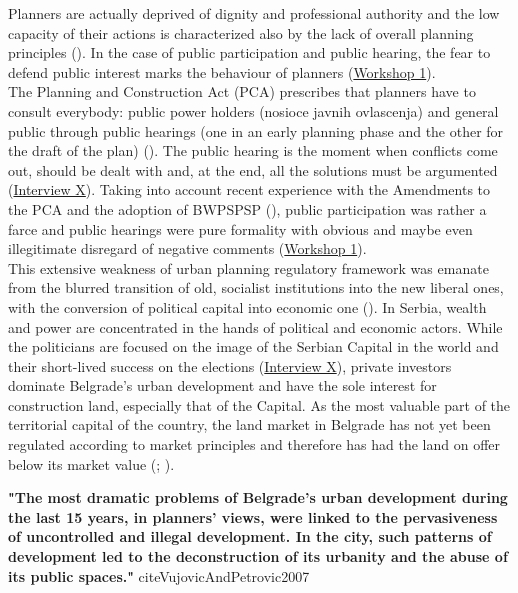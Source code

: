 \documentclass[11pt]{report}
\begin{document}
Planners are  actually deprived of dignity and professional authority and the low capacity of their actions is characterized also by the lack of overall planning principles (\href{ref}{\citealt{petrovic_cities_2009}}).
In the case of public participation and public hearing, the fear to defend public interest marks the behaviour of planners (\href{Expert Workshop}{Workshop 1}).
\\

The Planning and Construction Act (PCA) prescribes that planners have to consult everybody: public power holders (nosioce javnih ovlascenja) and general public through public hearings (one in an early planning phase and the other for the draft of the plan) (\cite{PCA}).
The public hearing is the moment when conflicts come out, should be dealt with and, at the end, all the solutions must be argumented (\href{InterviewX}{Interview X}).
Taking into account recent experience with the Amendments to the PCA and the adoption of BWPSPSP (\cite{ref media all different}), public participation was rather a farce and public hearings were pure formality with obvious and maybe even illegitimate disregard of negative comments (\href{Expert Workshop}{Workshop 1}).
\\ 

This extensive weakness of urban planning regulatory framework was emanate from the blurred transition of old, socialist institutions into the new liberal ones, with the conversion of political capital into economic one (\href{ref}{\citealt{vujovic_belgrades_2007}}).
In Serbia, wealth and power are concentrated in the hands of political and economic actors. While the politicians are focused on the image of the Serbian Capital in the world and their short-lived success on the elections (\href{InterviewX}{Interview X}),
private investors dominate Belgrade's urban development and have the sole interest for construction land, especially that of the Capital. As the most valuable part of the territorial capital of the country, the land market in Belgrade has not yet been regulated according to market principles and therefore has had the land on offer below its market value (\cite{SKGO2013}; \cite{Zekovic all ref}).
    
\textbf{"The most dramatic problems of Belgrade’s urban development during the last 15 years, in planners’ views, were linked to the pervasiveness of uncontrolled and illegal development. In the city, such patterns of development led to the deconstruction of its urbanity and the abuse of its public spaces."} cite{VujovicAndPetrovic2007}
\end{document}
